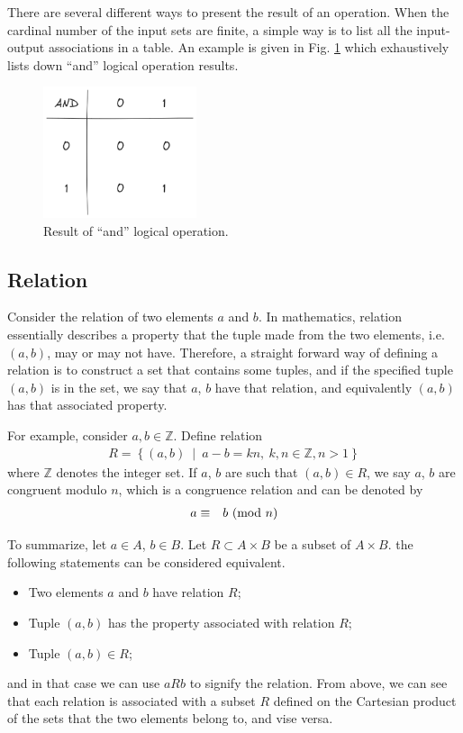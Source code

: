 There are several different ways to present the result of an operation. When the cardinal number of the input sets are finite, a simple way is to list all the input-output associations in a table. An example is given in Fig. \ref{fig:logical_and_mapping} which exhaustively lists down ``and'' logical operation results.
\begin{figure}[!htb]
	\centering
	\includegraphics[width=0.4\textwidth]{chapters/abstract-algebra-basics/figures/logical_and_mapping.png}
	\caption{Result of ``and'' logical operation.} \label{fig:logical_and_mapping}
\end{figure}

\subsection{Relation}

Consider the relation of two elements $a$ and $b$. In mathematics, relation essentially describes a property that the tuple made from the two elements, i.e. $(a,b)$, may or may not have. Therefore, a straight forward way of defining a relation is to construct a set that contains some tuples, and if the specified tuple $(a,b)$ is in the set, we say that $a$, $b$ have that relation, and equivalently $(a,b)$ has that associated property.

For example, consider $a,b\in\mathbb{Z}$. Define relation
\begin{eqnarray}
	R = \left\{(a,b)~\middle|~a-b = kn,~k,n \in\mathbb{Z}, n>1\right\}
\end{eqnarray}
where $\mathbb{Z}$ denotes the integer set. If $a$, $b$ are such that $(a,b)\in R$, we say $a$, $b$ are congruent modulo $n$, which is a congruence relation and can be denoted by
\begin{eqnarray}
	a &\equiv& b~(\textup{mod}~n) \nonumber
\end{eqnarray}

To summarize, let $a\in A$, $b\in B$. Let $R\subset A\times B$ be a subset of $A\times B$. the following statements can be considered equivalent.
\begin{itemize}
	\item Two elements $a$ and $b$ have relation $R$;
	\item Tuple $(a,b)$ has the property associated with relation $R$;
	\item Tuple $(a,b) \in R$;
\end{itemize}
and in that case we can use $aRb$ to signify the relation. From above, we can see that each relation is associated with a subset $R$ defined on the Cartesian product of the sets that the two elements belong to, and vise versa.

